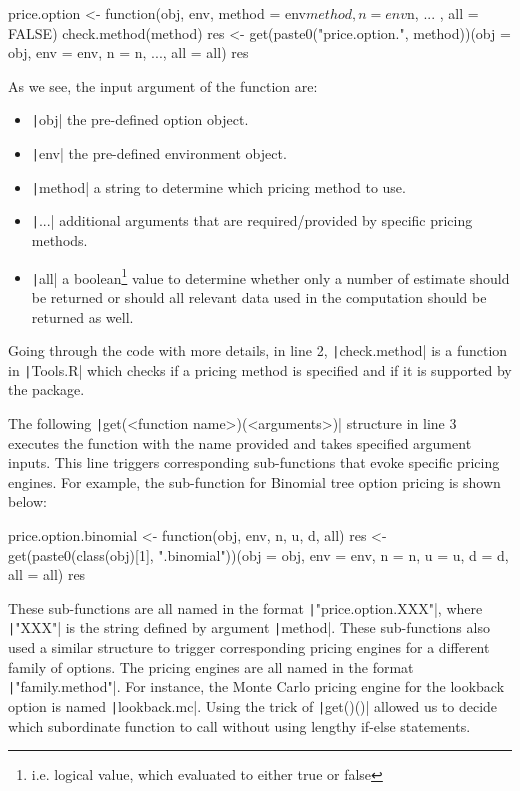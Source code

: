 \begin{Rminted}
price.option <- function(obj, env, method = env$method, n = env$n, ... , all = FALSE) {
    check.method(method)
    res <- get(paste0("price.option.", method))(obj = obj, env = env, n = n, ..., all = all)
    res
}
\end{Rminted}

As we see, the input argument of the function are:

\begin{itemize}
    \item \texttt|obj| the pre-defined option object.
    \item \texttt|env| the pre-defined environment object.
    \item \texttt|method| a string to determine which pricing method to use.
    \item \texttt|...| additional arguments that are required/provided by specific pricing methods.
    \item \texttt|all| a boolean\footnote{i.e. logical value, which evaluated to either true or false} value to determine whether only a number of estimate should be returned or should all relevant data used in the computation should be returned as well.
\end{itemize}

Going through the code with more details, in line 2, \texttt|check.method| is a function in \texttt|Tools.R| which checks if a pricing method is specified and if it is supported by the package.

The following \texttt|get(<function name>)(<arguments>)| structure in line 3 executes the function with the name provided and takes specified argument inputs. This line triggers corresponding sub-functions that evoke specific pricing engines. For example, the sub-function for Binomial tree option pricing is shown below:

\begin{Rminted}
price.option.binomial <- function(obj, env, n, u, d, all) {
    res <- get(paste0(class(obj)[1], ".binomial"))(obj = obj, env = env, n = n, u = u, d = d, all = all)
    res
}
\end{Rminted}

These sub-functions are all named in the format \texttt|"price.option.XXX"|, where \texttt|"XXX"| is the string defined by argument \texttt|method|. These sub-functions also used a similar structure to trigger corresponding pricing engines for a different family of options. The pricing engines are all named in the format \texttt|"family.method"|. For instance, the Monte Carlo pricing engine for the lookback option is named \texttt|lookback.mc|. Using the trick of \texttt|get()()| allowed us to decide which subordinate function to call without using lengthy if-else statements.

